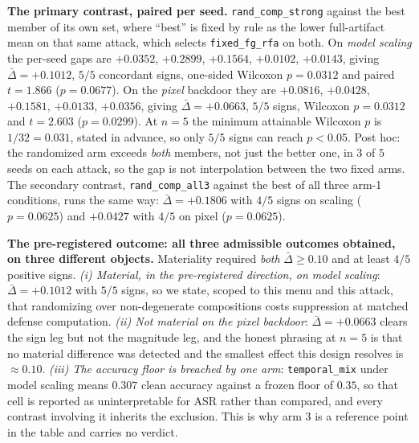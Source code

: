 \documentclass{article}
\begin{document}
\textbf{The primary contrast, paired per seed.} \texttt{rand\_comp\_strong} against the best member of
its own set, where ``best'' is fixed by rule as the lower full-artifact mean on that same attack, which
selects \texttt{fixed\_fg\_rfa} on both. On \emph{model scaling} the per-seed gaps are $+0.0352$,
$+0.2899$, $+0.1564$, $+0.0102$, $+0.0143$, giving $\bar{\Delta} = +0.1012$, $5/5$ concordant signs,
one-sided Wilcoxon $p=0.0312$ and paired $t=1.866$ ($p=0.0677$). On the \emph{pixel} backdoor they are
$+0.0816$, $+0.0428$, $+0.1581$, $+0.0133$, $+0.0356$, giving $\bar{\Delta} = +0.0663$, $5/5$ signs,
Wilcoxon $p=0.0312$ and $t=2.603$ ($p=0.0299$). At $n=5$ the minimum attainable Wilcoxon $p$ is
$1/32=0.031$, stated in advance, so only $5/5$ signs can reach $p<0.05$. Post hoc: the randomized arm
exceeds \emph{both} members, not just the better one, in $3$ of $5$ seeds on each attack, so the gap is
not interpolation between the two fixed arms. The secondary contrast, \texttt{rand\_comp\_all3} against
the best of all three arm-1 conditions, runs the same way: $\bar{\Delta} = +0.1806$ with $4/5$ signs on
scaling ($p=0.0625$) and $+0.0427$ with $4/5$ on pixel ($p=0.0625$).

\textbf{The pre-registered outcome: all three admissible outcomes obtained, on three different
objects.} Materiality required \emph{both} $\bar{\Delta} \geq 0.10$ and at least $4/5$ positive signs.
\emph{(i) Material, in the pre-registered direction, on model scaling}: $\bar{\Delta}=+0.1012$ with $5/5$
signs, so we state, scoped to this menu and this attack, that randomizing over non-degenerate
compositions costs suppression at matched defense computation. \emph{(ii) Not material on the pixel
backdoor}: $\bar{\Delta}=+0.0663$ clears the sign leg but not the magnitude leg, and the honest phrasing
at $n=5$ is that no material difference was detected and the smallest effect this design resolves is
$\approx 0.10$. \emph{(iii) The accuracy floor is breached by one arm}: \texttt{temporal\_mix} under model
scaling means $0.307$ clean accuracy against a frozen floor of $0.35$, so that cell is reported as
uninterpretable for ASR rather than compared, and every contrast involving it inherits the exclusion.
This is why arm 3 is a reference point in the table and carries no verdict.
\end{document}
